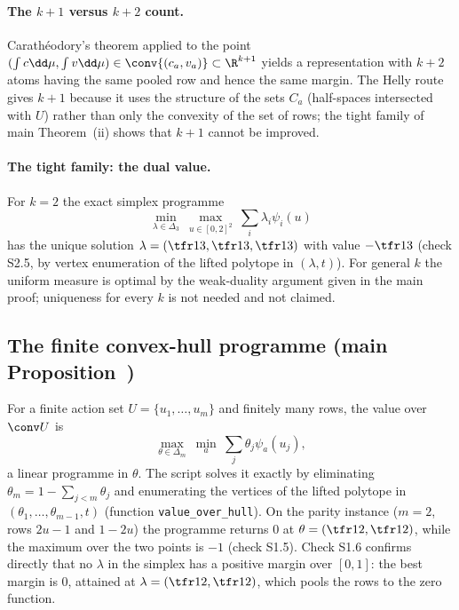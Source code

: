 \paragraph{The $k+1$ versus $k+2$ count.} Carath\'eodory's theorem applied to the point $(\int c\dd\mu,\int v\dd\mu)\in\conv\{(c_a,v_a)\}\subset\R^{k+1}$ yields a representation with $k+2$ atoms having the same pooled row and hence the same margin. The Helly route gives $k+1$ because it uses the structure of the sets $C_a$ (half-spaces intersected with $U$) rather than only the convexity of the set of rows; the tight family of main Theorem~(ii) shows that $k+1$ cannot be improved.

\paragraph{The tight family: the dual value.} For $k=2$ the exact simplex programme
\[
\min_{\lambda\in\Delta_3}\ \max_{u\in[0,2]^2}\ \sum_i\lambda_i\psi_i(u)
\]
has the unique solution $\lambda=(\tfr13,\tfr13,\tfr13)$ with value $-\tfr13$ (check S2.5, by vertex enumeration of the lifted polytope in $(\lambda,t)$). For general $k$ the uniform measure is optimal by the weak-duality argument given in the main proof; uniqueness for every $k$ is not needed and not claimed.

\subsection{The finite convex-hull programme (main Proposition~)}
For a finite action set $U=\{u_1,\dots,u_m\}$ and finitely many rows, the value over $\conv U$ is
\[
\max_{\theta\in\Delta_m}\ \min_a\ \sum_j\theta_j\psi_a(u_j),
\]
a linear programme in $\theta$. The script solves it exactly by eliminating $\theta_m=1-\sum_{j<m}\theta_j$ and enumerating the vertices of the lifted polytope in $(\theta_1,\dots,\theta_{m-1},t)$ (function \texttt{value\_over\_hull}). On the parity instance ($m=2$, rows $2u-1$ and $1-2u$) the programme returns $0$ at $\theta=(\tfr12,\tfr12)$, while the maximum over the two points is $-1$ (check S1.5). Check S1.6 confirms directly that no $\lambda$ in the simplex has a positive margin over $[0,1]$: the best margin is $0$, attained at $\lambda=(\tfr12,\tfr12)$, which pools the rows to the zero function.

